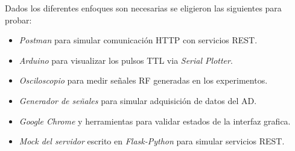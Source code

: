 Dados los diferentes enfoques son necesarias se eligieron las siguientes para probar:
\begin{itemize}
    \item \textit{Postman} para simular comunicaci\'on HTTP con servicios REST.
    \item \textit{Arduino} para visualizar los pulsos TTL via \textit{Serial Plotter}.
    \item \textit{Osciloscopio} para medir señales RF generadas en los experimentos.
    \item \textit{Generador de señales} para simular adquisici\'on de datos del AD.
    \item \textit{Google Chrome} y herramientas para validar estados de la interfaz grafica.
    \item \textit{Mock del servidor} escrito en \textit{Flask-Python} para simular servicios REST.
\end{itemize}
\newpage